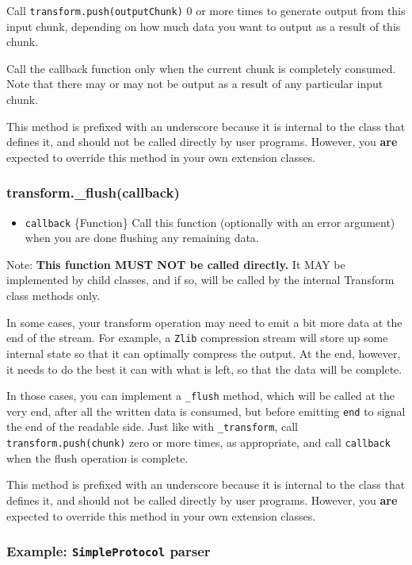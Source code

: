 Call \texttt{transform.push(outputChunk)} 0 or more times to generate
output from this input chunk, depending on how much data you want to
output as a result of this chunk.

Call the callback function only when the current chunk is completely
consumed. Note that there may or may not be output as a result of any
particular input chunk.

This method is prefixed with an underscore because it is internal to the
class that defines it, and should not be called directly by user
programs. However, you \textbf{are} expected to override this method in
your own extension classes.

\subsubsection{transform.\_flush(callback)}

\begin{itemize}
\item
  \texttt{callback} \{Function\} Call this function (optionally with an
  error argument) when you are done flushing any remaining data.
\end{itemize}

Note: \textbf{This function MUST NOT be called directly.} It MAY be
implemented by child classes, and if so, will be called by the internal
Transform class methods only.

In some cases, your transform operation may need to emit a bit more data
at the end of the stream. For example, a \texttt{Zlib} compression
stream will store up some internal state so that it can optimally
compress the output. At the end, however, it needs to do the best it can
with what is left, so that the data will be complete.

In those cases, you can implement a \texttt{\_flush} method, which will
be called at the very end, after all the written data is consumed, but
before emitting \texttt{end} to signal the end of the readable side.
Just like with \texttt{\_transform}, call \texttt{transform.push(chunk)}
zero or more times, as appropriate, and call \texttt{callback} when the
flush operation is complete.

This method is prefixed with an underscore because it is internal to the
class that defines it, and should not be called directly by user
programs. However, you \textbf{are} expected to override this method in
your own extension classes.

\subsubsection{Example: \texttt{SimpleProtocol} parser}


